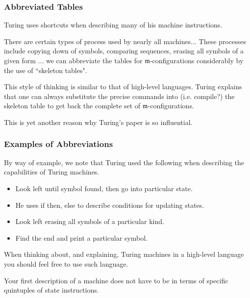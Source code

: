 \documentclass{beamer}
\begin{document}
\begin{frame}
	\frametitle{Abbreviated Tables}

	Turing uses shortcuts when describing many of his machine instructions.

	\vspace{0.5cm}

	\begin{displayquote}
		There are certain types of process used by nearly all machines... These processes include copying down of symbols, comparing sequences, erasing all symbols of a given form ... we can abbreviate the tables for $\mathfrak{m}$-configurations considerably by the use of ``skeleton tables".		
	\end{displayquote}

	\vspace{0.5cm}

	This style of thinking is similar to that of high-level languages. Turing explains that one can always substitute the precise commands into (i.e. compile?) the skeleton table to get back the complete set of $\mathfrak{m}$-configurations. 

	\vspace{0.5cm}

	This is yet another reason why Turing's paper is so influential.

\end{frame}

\begin{frame}
	\frametitle{Examples of Abbreviations}

	By way of example, we note that Turing used the following when describing the capabilities of Turing machines. 

	\begin{itemize}
		\item[] Look left until symbol found, then go into particular state.
		\item[] He uses if then, else to describe conditions for updating states.
		\item[] Look left erasing all symbols of a particular kind. 
		\item[] Find the end and print a particular symbol. 
	\end{itemize}
	
	When thinking about, and explaining, Turing machines in a high-level language you should feel free to use such language. 

	\vspace{0.5cm}

	Your first description of a machine does not have to be in terms of specific quintuples of state instructions. 

\end{frame}
\end{document}
